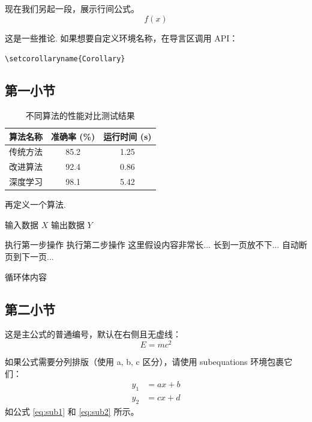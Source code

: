 \documentclass[bibbackend=biber]{csuthesis}
\theoremstyle{csutheorem}
\begin{document}
现在我们另起一段，展示行间公式。
\[f(x)\]
\zhlipsum[3]
\begin{Corollary}
    这是一些推论. 如果想要自定义环境名称，在导言区调用 API： 
    
    \verb|\setcorollaryname{Corollary}|
\end{Corollary}
\subsection{第一小节}
\begin{table}[ht]
    \centering
    \caption{不同算法的性能对比测试结果} %
    \begin{tabular}{c c c} %
        \toprule %
        算法名称 & 准确率 (\%) & 运行时间 (s) \\
        \midrule %
        传统方法 & 85.2 & 1.25 \\
        改进算法 & 92.4 & 0.86 \\
        深度学习 & 98.1 & 5.42 \\
        \bottomrule %
    \end{tabular}
\end{table}
再定义一个算法.
\begin{mdframed}
\label{alg:long_algo}
\begin{algorithmic}[1] %
    \Require 输入数据 $X$
    \Ensure 输出数据 $Y$
    
        \State 执行第一步操作 
        \State 执行第二步操作
        \State 这里假设内容非常长...
        \State 长到一页放不下...
        \State 自动断页到下一页...
    \EndFor
    
        \State 循环体内容
    \EndWhile
\end{algorithmic}
\end{mdframed}
\subsection{第二小节}
这是主公式的普通编号，默认在右侧且无虚线：
\begin{equation}
    E = mc^2
\end{equation}

如果公式需要分列排版（使用 a, b, c 区分），请使用 subequations 环境包裹它们：
\begin{subequations}
    \begin{align}
        y_1 &= ax + b \label{eq:sub1} \\
        y_2 &= cx + d \label{eq:sub2}
    \end{align}
\end{subequations}
如公式 \eqref{eq:sub1} 和 \eqref{eq:sub2} 所示。
\end{document}
